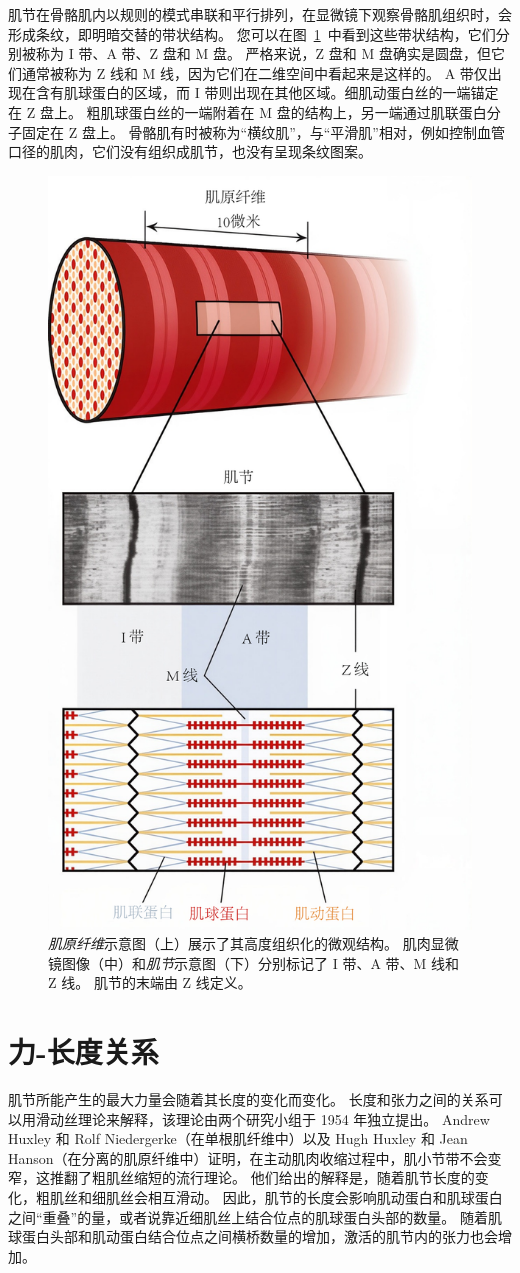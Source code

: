 肌节在骨骼肌内以规则的模式串联和平行排列，在显微镜下观察骨骼肌组织时，会形成条纹，即明暗交替的带状结构。
您可以在图~\ref{fig:4_5}~中看到这些带状结构，它们分别被称为 I 带、A 带、Z 盘和 M 盘。
严格来说，Z 盘和 M 盘确实是圆盘，但它们通常被称为 Z 线和 M 线，因为它们在二维空间中看起来是这样的。
A 带仅出现在含有肌球蛋白的区域，而 I 带则出现在其他区域。细肌动蛋白丝的一端锚定在 Z 盘上。
粗肌球蛋白丝的一端附着在 M 盘的结构上，另一端通过肌联蛋白分子固定在 Z 盘上。
骨骼肌有时被称为“横纹肌”，与“平滑肌”相对，例如控制血管口径的肌肉，它们没有组织成肌节，也没有呈现条纹图案。

\begin{figure}[!htb]
	\centering
	\includegraphics[width=0.5\linewidth]{chap4/4_5}
	\caption{\textit{肌原纤维}示意图（上）展示了其高度组织化的微观结构。
		肌肉显微镜图像（中）和\textit{肌节}示意图（下）分别标记了 I 带、A 带、M 线和 Z 线。
		肌节的末端由 Z 线定义。 \label{fig:4_5}}
\end{figure}


\section{力-长度关系}

肌节所能产生的最大力量会随着其长度的变化而变化。
长度和张力之间的关系可以用滑动丝理论来解释，该理论由两个研究小组于 1954 年独立提出。
Andrew Huxley 和 Rolf Niedergerke（在单根肌纤维中）以及 Hugh Huxley 和 Jean Hanson（在分离的肌原纤维中）证明，在主动肌肉收缩过程中，肌小节带不会变窄，这推翻了粗肌丝缩短的流行理论。
他们给出的解释是，随着肌节长度的变化，粗肌丝和细肌丝会相互滑动。
因此，肌节的长度会影响肌动蛋白和肌球蛋白之间“重叠”的量，或者说靠近细肌丝上结合位点的肌球蛋白头部的数量。
随着肌球蛋白头部和肌动蛋白结合位点之间横桥数量的增加，激活的肌节内的张力也会增加。


